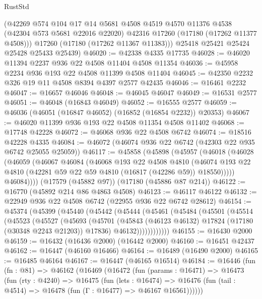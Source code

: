 \begin{lexlean}{RustStd}
\begin{coremodule}
{\begin{coremodule}
{{{{{{{{{{{{{{{{{{{{{{{{{{{{{{{{{{{{{{{{{{{{{{{{{{{{{{{        (@42269
          @574
          @104
          @17
          @14
          @5681
          @4508
          @4519
          @4570
          @11376
          @4538
          (@42304 @573 @5681 @22016 @22020)
          @42316
          @17260
          (@17180 (@17262 @11377 @4508)))
        @17260
        (@17180 (@17262 @11367 @11383)))
      @25418
      @25421
      @25424
      @25428
      @25433
      @25439)
@46020 := @42338 @4335 @17735
@46028 := @46020 @11394 @2237 @936 @22 @4508 @11404 @4508 @11354
@46036 := @45958 @2234 @936 @193 @22 @4508 @11399 @4508 @11404
@46045 := @42350 @2232 @326 @19 @11 @4508 @8394 @4397 @2577 @42435
@46046 := @16461 @2232
@46047 := @16657 @46046
@46048 := @46045 @46047
@46049 := @16531 @2577
@46051 := @46048 (@16843 @46049)
@46052 := @16555 @2577
@46059 := @46036 (@46051 (@16847 @46052) (@16852 (@16854 @2232)) @20353)
@46067 := @46020 @11399 @936 @193 @22 @4508 @11354 @4508 @11402
@46068 := @17748 @42228
@46072 := @46068 @936 @22 @4508 @6742
@46074 := @18516 @42228 @4335
@46084 := @46072 (@46074 @936 @22 @6742 (@42303 @22 @935 @6742 @25055 @25059))
@46117 := @45858
    (@45898
      (@45957
        (@46018
          (@46028
            (@46059
              (@46067
                @46084
                (@46068
                  @193
                  @22
                  @4508
                  @4810
                  (@46074 @193 @22 @4810 (@42281 @59 @22 @59 @4810 (@16817 (@42286 @59)) @18550)))))
            @46084))))
    (@17579 (@45882 @97))
    (@17180 (@45886 @87 @214))
@46122 := @16770 (@45892 @214 @86 @4863 @4508)
@46123 := @46117 @46122
@46132 := @22949 @936 @22 @4508 @6742 (@22955 @936 @22 @6742 @28612)
@46154 := @45374
    (@45399
      (@45440
        (@45442
          (@45444
            (@45461
              (@45484
                (@45501
                  (@45514
                    (@45523
                      (@45527
                        (@45693
                          (@45701
                            (@45843 (@46123 @46132) @17824 (@17180 (@30348 @2243 @21203)) @17836)
                            @46132))))))))))))
@46155 := @16430 @2000
@46159 := @16432 (@16436 @2000) (@16442 @2000)
@46160 := @16451 @42437
@46162 := @16447 (@46160 @16466)
@46164 := @16489 (@16490 @2000)
@46165 := @16485 @46164
@46167 := @16447 (@46165 @16514)
@46184 := @16446
    (fun (fn : @81) =>
    @46162
      (@16469
        (@16472
          (fun (params : @16471) =>
          @16473
            (fun (rty : @4240) =>
            @16475
              (fun (lets : @16474) =>
              @16476 (fun (tail : @4514) => @16478 (fun (Γ : @16477) => @46167 @16561))))))
}}}}}}}}}}}}}}}}}}}}}}}}}}}}}}}}}}}}}}}}}}}}}}}}}}}}}}}
\end{coremodule}}
\end{coremodule}
\end{lexlean}
